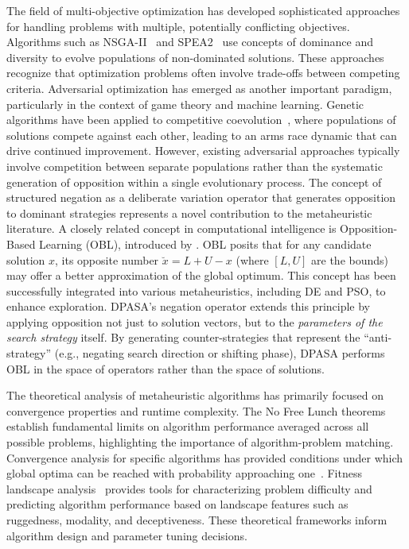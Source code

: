 \documentclass[11pt]{article}
\begin{document}
The field of multi-objective optimization has developed sophisticated approaches for handling problems with multiple, potentially conflicting objectives. Algorithms such as NSGA-II~\citep{deb2002fast} and SPEA2~\citep{zitzler2001spea2} use concepts of dominance and diversity to evolve populations of non-dominated solutions. These approaches recognize that optimization problems often involve trade-offs between competing criteria.
Adversarial optimization has emerged as another important paradigm, particularly in the context of game theory and machine learning. Genetic algorithms have been applied to competitive coevolution~\citep{hillis1990co}, where populations of solutions compete against each other, leading to an arms race dynamic that can drive continued improvement.
However, existing adversarial approaches typically involve competition between separate populations rather than the systematic generation of opposition within a single evolutionary process. The concept of structured negation as a deliberate variation operator that generates opposition to dominant strategies represents a novel contribution to the metaheuristic literature.
A closely related concept in computational intelligence is Opposition-Based Learning (OBL), introduced by \cite{tizhoosh2005opposition}. OBL posits that for any candidate solution $x$, its opposite number $\breve{x} = L + U - x$ (where $[L, U]$ are the bounds) may offer a better approximation of the global optimum. This concept has been successfully integrated into various metaheuristics, including DE and PSO, to enhance exploration. DPASA's negation operator extends this principle by applying opposition not just to solution vectors, but to the \textit{parameters of the search strategy} itself. By generating counter-strategies that represent the ``anti-strategy'' (e.g., negating search direction or shifting phase), DPASA performs OBL in the space of operators rather than the space of solutions.



The theoretical analysis of metaheuristic algorithms has primarily focused on convergence properties and runtime complexity. The No Free Lunch theorems~\citep{wolpert1997no} establish fundamental limits on algorithm performance averaged across all possible problems, highlighting the importance of algorithm-problem matching. Convergence analysis for specific algorithms has provided conditions under which global optima can be reached with probability approaching one~\citep{rudolph1994convergence}.
Fitness landscape analysis~\citep{malan2013survey} provides tools for characterizing problem difficulty and predicting algorithm performance based on landscape features such as ruggedness, modality, and deceptiveness. These theoretical frameworks inform algorithm design and parameter tuning decisions.
\end{document}
